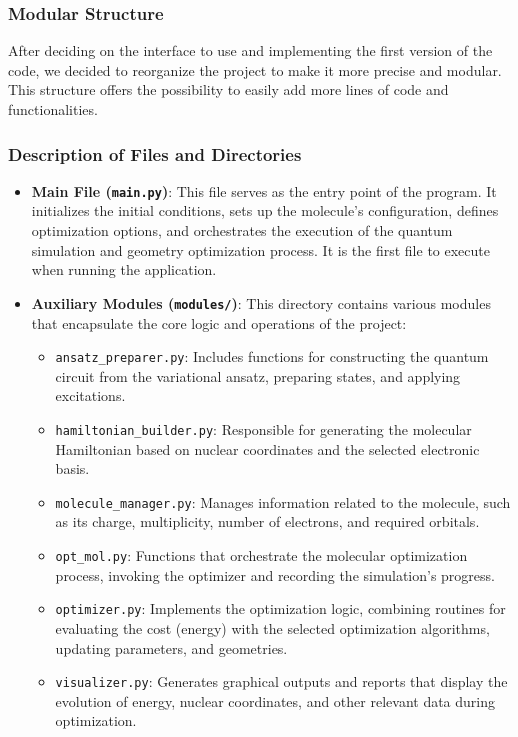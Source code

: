 \subsubsection{Modular Structure}
After deciding on the interface to use and implementing the first version of the code, we decided to reorganize the project to make it more precise and modular. This structure offers the possibility to easily add more lines of code and functionalities.

\subsubsection{Description of Files and Directories}

\begin{itemize}
    \item \textbf{Main File (\texttt{main.py})}:  
    This file serves as the entry point of the program. It initializes the initial conditions, sets up the molecule's configuration, defines optimization options, and orchestrates the execution of the quantum simulation and geometry optimization process. It is the first file to execute when running the application.

    \item \textbf{Auxiliary Modules (\texttt{modules/})}:  
    This directory contains various modules that encapsulate the core logic and operations of the project:
    \begin{itemize}
        \item \texttt{ansatz\_preparer.py}: Includes functions for constructing the quantum circuit from the variational ansatz, preparing states, and applying excitations.
        \item \texttt{hamiltonian\_builder.py}: Responsible for generating the molecular Hamiltonian based on nuclear coordinates and the selected electronic basis.
        \item \texttt{molecule\_manager.py}: Manages information related to the molecule, such as its charge, multiplicity, number of electrons, and required orbitals.
        \item \texttt{opt\_mol.py}: Functions that orchestrate the molecular optimization process, invoking the optimizer and recording the simulation's progress.
        \item \texttt{optimizer.py}: Implements the optimization logic, combining routines for evaluating the cost (energy) with the selected optimization algorithms, updating parameters, and geometries.
        \item \texttt{visualizer.py}: Generates graphical outputs and reports that display the evolution of energy, nuclear coordinates, and other relevant data during optimization.
    \end{itemize}


\end{itemize}
